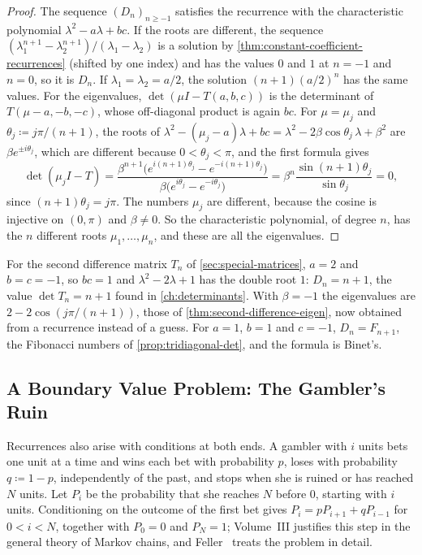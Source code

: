 \begin{proof}
The sequence $(D_n)_{n\ge-1}$ satisfies the recurrence with the characteristic polynomial $\lambda^2-a\lambda+bc$. If the roots are different, the sequence $(\lambda_1^{n+1}-\lambda_2^{n+1})/(\lambda_1-\lambda_2)$ is a solution by \cref{thm:constant-coefficient-recurrences} (shifted by one index) and has the values $0$ and $1$ at $n=-1$ and $n=0$, so it is $D_n$. If $\lambda_1=\lambda_2=a/2$, the solution $(n+1)(a/2)^n$ has the same values. For the eigenvalues, $\det(\mu I-T(a,b,c))$ is the determinant of $T(\mu-a,-b,-c)$, whose off-diagonal product is again $bc$. For $\mu=\mu_j$ and $\theta_j\coloneqq j\pi/(n+1)$, the roots of $\lambda^2-(\mu_j-a)\lambda+bc=\lambda^2-2\beta\cos\theta_j\,\lambda+\beta^2$ are $\beta e^{\pm i\theta_j}$, which are different because $0<\theta_j<\pi$, and the first formula gives
\[
\det(\mu_jI-T)=\frac{\beta^{n+1}\bigl(e^{i(n+1)\theta_j}-e^{-i(n+1)\theta_j}\bigr)}{\beta\bigl(e^{i\theta_j}-e^{-i\theta_j}\bigr)}=\beta^n\frac{\sin(n+1)\theta_j}{\sin\theta_j}=0 ,
\]
since $(n+1)\theta_j=j\pi$. The numbers $\mu_j$ are different, because the cosine is injective on $(0,\pi)$ and $\beta\ne0$. So the characteristic polynomial, of degree $n$, has the $n$ different roots $\mu_1,\ldots,\mu_n$, and these are all the eigenvalues.
\end{proof}

For the second difference matrix $T_n$ of \cref{sec:special-matrices}, $a=2$ and $b=c=-1$, so $bc=1$ and $\lambda^2-2\lambda+1$ has the double root $1$: $D_n=n+1$, the value $\det T_n=n+1$ found in \cref{ch:determinants}. With $\beta=-1$ the eigenvalues are $2-2\cos(j\pi/(n+1))$, those of \cref{thm:second-difference-eigen}, now obtained from a recurrence instead of a guess. For $a=1$, $b=1$ and $c=-1$, $D_n=F_{n+1}$, the Fibonacci numbers of \cref{prop:tridiagonal-det}, and the formula is Binet's.

\subsection{A Boundary Value Problem: The Gambler's Ruin}

Recurrences also arise with conditions at both ends. A gambler with $i$ units bets one unit at a time and wins each bet with probability $p$, loses with probability $q\coloneqq1-p$, independently of the past, and stops when she is ruined or has reached $N$ units. Let $P_i$ be the probability that she reaches $N$ before $0$, starting with $i$ units. Conditioning on the outcome of the first bet gives $P_i=pP_{i+1}+qP_{i-1}$ for $0<i<N$, together with $P_0=0$ and $P_N=1$; Volume~III justifies this step in the general theory of Markov chains, and Feller~\cite[Chap.~XIV]{feller1968} treats the problem in detail.


